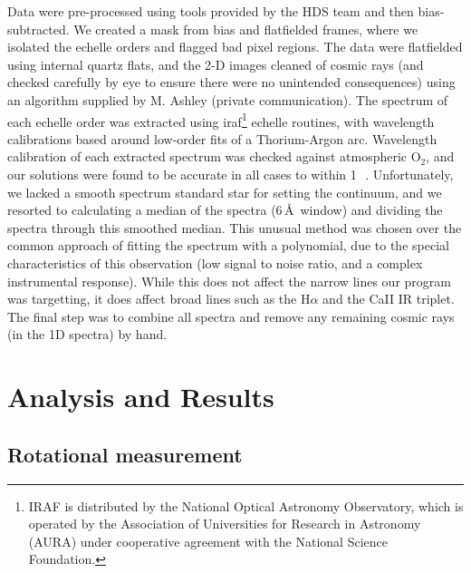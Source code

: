 Data were pre-processed using tools provided by the HDS team and then
bias-subtracted. We created a mask from bias and flatfielded frames,
where we isolated the echelle orders and flagged bad pixel
regions. The data were flatfielded using internal quartz flats, and the
2-D images cleaned of cosmic rays (and checked carefully by eye to
ensure there were no unintended consequences) using an algorithm
supplied by M. Ashley (private communication). The spectrum of each
echelle order was extracted using \gls{iraf}\footnote{IRAF is distributed by
the National Optical Astronomy Observatory, which is operated by the
Association of Universities for Research in Astronomy (AURA) under
cooperative agreement with the National Science Foundation.}  echelle
routines, with wavelength calibrations based around low-order fits of
a Thorium-Argon arc. Wavelength calibration of each extracted spectrum
was checked against atmospheric O$_2$, and our solutions were found to
be accurate in all cases to within 1\,\kms\
\citep{1985A&A...149..357C}. Unfortunately, we lacked a smooth
spectrum standard star for setting the continuum, and we resorted to
calculating a median of the spectra (6\,\AA\ window) and dividing the
spectra through this smoothed median. This unusual method was chosen
over the common approach of fitting the spectrum with a polynomial,
due to the special characteristics of this observation (low signal to noise ratio, and a complex instrumental response). While this does not affect the narrow lines our program was
targetting, it does affect broad lines such as the H$\alpha$ and the
CaII IR triplet. The final step was to combine all spectra and remove
any remaining cosmic rays (in the 1D spectra) by hand.

\section{Analysis and Results}

\subsection{Rotational measurement}

